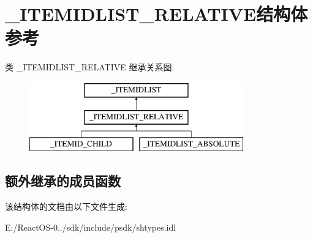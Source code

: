 \hypertarget{struct___i_t_e_m_i_d_l_i_s_t___r_e_l_a_t_i_v_e}{}\section{\+\_\+\+I\+T\+E\+M\+I\+D\+L\+I\+S\+T\+\_\+\+R\+E\+L\+A\+T\+I\+V\+E结构体 参考}
\label{struct___i_t_e_m_i_d_l_i_s_t___r_e_l_a_t_i_v_e}
类 \+\_\+\+I\+T\+E\+M\+I\+D\+L\+I\+S\+T\+\_\+\+R\+E\+L\+A\+T\+I\+VE 继承关系图\+:\begin{figure}[H]
\begin{center}
\leavevmode
\includegraphics[height=3.000000cm]{struct___i_t_e_m_i_d_l_i_s_t___r_e_l_a_t_i_v_e}
\end{center}
\end{figure}
\subsection*{额外继承的成员函数}


该结构体的文档由以下文件生成\+:\begin{DoxyCompactItemize}
\item 
E\+:/\+React\+O\+S-\/0../sdk/include/psdk/shtypes.\+idl\end{DoxyCompactItemize}
